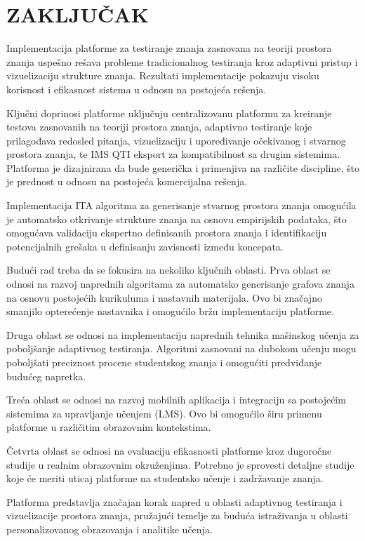 \documentclass[conference]{IEEEtran}
\begin{document}
\section{ZAKLJUČAK}

Implementacija platforme za testiranje znanja zasnovana na teoriji prostora znanja uspešno rešava probleme tradicionalnog testiranja kroz adaptivni pristup i vizuelizaciju strukture znanja. Rezultati implementacije pokazuju visoku korisnost i efikasnost sistema u odnosu na postojeća rešenja.

Ključni doprinosi platforme uključuju centralizovanu platformu za kreiranje testova zasnovanih na teoriji prostora znanja, adaptivno testiranje koje prilagođava redosled pitanja, vizuelizaciju i upoređivanje očekivanog i stvarnog prostora znanja, te IMS QTI eksport za kompatibilnost sa drugim sistemima. Platforma je dizajnirana da bude generička i primenjiva na različite discipline, što je prednost u odnosu na postojeća komercijalna rešenja.

Implementacija ITA algoritma za generisanje stvarnog prostora znanja omogućila je automatsko otkrivanje strukture znanja na osnovu empirijskih podataka, što omogućava validaciju ekspertno definisanih prostora znanja i identifikaciju potencijalnih grešaka u definisanju zavisnosti između koncepata.

Budući rad treba da se fokusira na nekoliko ključnih oblasti. Prva oblast se odnosi na razvoj naprednih algoritama za automatsko generisanje grafova znanja na osnovu postojećih kurikuluma i nastavnih materijala. Ovo bi značajno smanjilo opterećenje nastavnika i omogućilo bržu implementaciju platforme.

Druga oblast se odnosi na implementaciju naprednih tehnika mašinskog učenja za poboljšanje adaptivnog testiranja. Algoritmi zasnovani na dubokom učenju mogu poboljšati preciznost procene studentskog znanja i omogućiti predviđanje budućeg napretka.

Treća oblast se odnosi na razvoj mobilnih aplikacija i integraciju sa postojećim sistemima za upravljanje učenjem (LMS). Ovo bi omogućilo širu primenu platforme u različitim obrazovnim kontekstima.

Četvrta oblast se odnosi na evaluaciju efikasnosti platforme kroz dugoročne studije u realnim obrazovnim okruženjima. Potrebno je sprovesti detaljne studije koje će meriti uticaj platforme na studentsko učenje i zadržavanje znanja.

Platforma predstavlja značajan korak napred u oblasti adaptivnog testiranja i vizuelizacije prostora znanja, pružajući temelje za buduća istraživanja u oblasti personalizovanog obrazovanja i analitike učenja.
\end{document}
